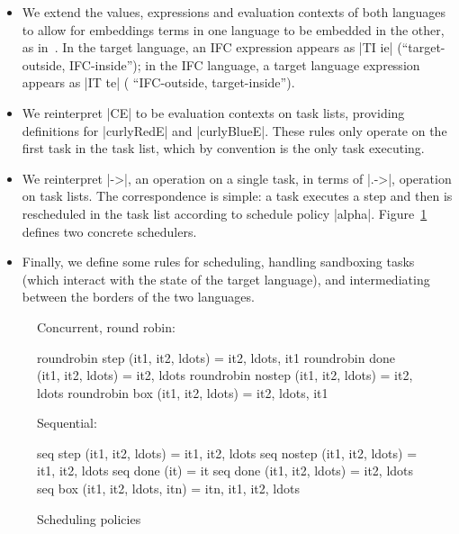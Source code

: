 \begin{itemize}
    \item We extend the values, expressions and evaluation contexts of
      both languages to allow for embeddings terms in one language to
      be embedded in the other, as
      in~\cite{Matthews:2007:OSM:1190216.1190220}.
In the target language, an IFC expression appears as |TI ie| (``target-outside,
IFC-inside''); in the IFC language, a target language expression appears as |IT
te| ( ``IFC-outside, target-inside'').
    \item We reinterpret |CE| to be evaluation contexts on task lists, providing definitions for |curlyRedE| and |curlyBlueE|.  These rules only operate on the first task in the task list, which by convention is the only task executing.
    \item We reinterpret |->|, an operation on a single task, in terms of |.->|, operation on task lists.  The correspondence is simple: a task executes a step and then is rescheduled in the task list according to schedule policy |alpha|.
    Figure~\ref{fig:scheduler} defines two concrete schedulers.
    \item Finally, we define some rules for scheduling, handling sandboxing tasks (which interact with the state of the target language),
    and intermediating between the borders of the two languages.
\end{itemize}

\begin{figure}
  Concurrent, round robin:
\begin{code}
  roundrobin step (it1, it2, ldots)    = it2, ldots, it1
  roundrobin done (it1, it2, ldots)    = it2, ldots
  roundrobin nostep (it1, it2, ldots)  = it2, ldots
  roundrobin box (it1, it2, ldots)     = it2, ldots, it1
\end{code}
  Sequential:
\begin{code}
  seq step (it1, it2, ldots)      = it1, it2, ldots
  seq nostep (it1, it2, ldots)    = it1, it2, ldots
  seq done (it)                   = it
  seq done (it1, it2, ldots)      = it2, ldots
  seq box (it1, it2, ldots, itn)  = itn, it1, it2, ldots
\end{code}
\caption{Scheduling policies}
\label{fig:scheduler}
\end{figure}

